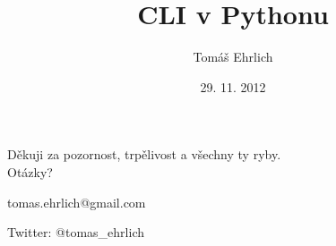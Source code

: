 \documentclass{beamer}
\title{CLI v Pythonu}
\author{Tomáš Ehrlich}
\date{29. 11. 2012}
\begin{document}
\begin{frame}\titlepage\end{frame}





\begin{frame}
\begin{center}
Děkuji za pozornost, trpělivost a všechny ty ryby.\\[2cm]

Otázky?

\vfill


tomas.ehrlich@gmail.com

Twitter: @tomas\_ehrlich
\end{center}
\end{frame}
\end{document}
